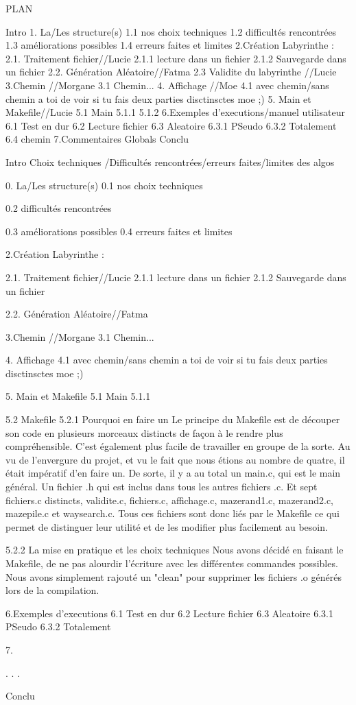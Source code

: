 PLAN

Intro
1. La/Les  structure(s)
  1.1 nos choix techniques
  1.2 difficultés rencontrées
  1.3 améliorations possibles
  1.4 erreurs faites et limites
2.Création Labyrinthe :
  2.1. Traitement fichier//Lucie
    2.1.1 lecture dans un fichier
    2.1.2 Sauvegarde dans un fichier
  2.2. Génération Aléatoire//Fatma
  2.3 Validite du labyrinthe //Lucie
3.Chemin //Morgane
  3.1 Chemin...
4. Affichage //Moe
  4.1 avec chemin/sans chemin a toi de voir si tu fais deux parties disctinsctes moe ;)
5. Main et Makefile//Lucie
  5.1 Main
    5.1.1
    5.1.2
6.Exemples d'executions/manuel utilisateur
  6.1 Test en dur
  6.2 Lecture fichier
  6.3 Aleatoire
    6.3.1 PSeudo
    6.3.2 Totalement
  6.4 chemin
7.Commentaires Globals
Conclu






Intro
Choix techniques /Difficultés rencontrées/erreurs faites/limites des algos


0. La/Les  structure(s)
0.1 nos choix techniques
 
0.2 difficultés rencontrées

0.3 améliorations possibles
0.4 erreurs faites et limites

2.Création Labyrinthe :

2.1. Traitement fichier//Lucie
2.1.1 lecture dans un fichier
2.1.2 Sauvegarde dans un fichier

2.2. Génération Aléatoire//Fatma

3.Chemin //Morgane
3.1 Chemin...

4. Affichage 
4.1 avec chemin/sans chemin a toi de voir si tu fais deux parties disctinsctes moe ;)

5. Main et Makefile
5.1 Main
5.1.1



5.2 Makefile
5.2.1 Pourquoi en faire un
Le principe du Makefile est de découper son code en plusieurs morceaux distincts de façon à le rendre plus compréhensible.
C'est également plus facile de travailler en groupe de la sorte. 
Au vu de l'envergure du projet, et vu le fait que nous étions au nombre de quatre, il était impératif d'en faire un. 
De sorte, il y a au total un main.c, qui est le main général. Un fichier .h qui est inclus dans tous les autres fichiers .c.  
Et sept fichiers.c distincts, validite.c, fichiers.c, affichage.c, mazerand1.c, mazerand2.c, mazepile.c et waysearch.c.
Tous ces fichiers sont donc liés par le Makefile ce qui permet de distinguer leur utilité et de les modifier plus facilement au besoin.

5.2.2 La mise en pratique et les choix techniques
Nous avons décidé en faisant le Makefile, de ne pas alourdir l'écriture avec les différentes commandes possibles.
Nous avons simplement rajouté un "clean" pour supprimer les fichiers .o générés lors de la compilation. 



6.Exemples d'executions
6.1 Test en dur
6.2 Lecture fichier
6.3 Aleatoire
6.3.1 PSeudo
6.3.2 Totalement

7.


.
.
.

Conclu
